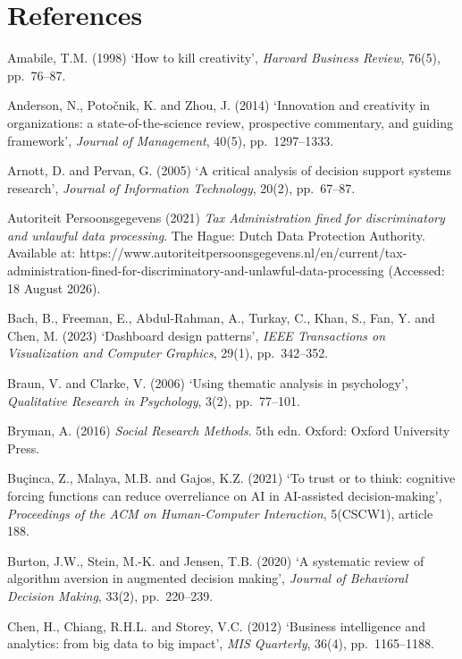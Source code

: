 \documentclass[11pt,a4paper]{article}
\numberwithin{figure}{section}
\numberwithin{table}{section}
\newcommand{\ct}[1]{\textcolor{citeblue}{#1}}          %
\begin{document}
\section*{References}
{\small{}
\setlength{\parindent}{-1.1em}
\setlength{\leftskip}{1.1em}
\setlength{\parskip}{4pt}

Amabile, T.M. (1998) `How to kill creativity', \emph{Harvard Business Review}, 76(5), pp.~76--87.

Anderson, N., Potočnik, K. and Zhou, J. (2014) `Innovation and creativity in organizations: a
state-of-the-science review, prospective commentary, and guiding framework', \emph{Journal of
Management}, 40(5), pp.~1297--1333.

Arnott, D. and Pervan, G. (2005) `A critical analysis of decision support systems research',
\emph{Journal of Information Technology}, 20(2), pp.~67--87.

Autoriteit Persoonsgegevens (2021) \emph{Tax Administration fined for discriminatory and unlawful
data processing}. The Hague: Dutch Data Protection Authority. Available at:
\ct{https://www.autoriteitpersoonsgegevens.nl/en/current/tax-administration-fined-for-discriminatory-and-unlawful-data-processing}
(Accessed: 18 August 2026).

Bach, B., Freeman, E., Abdul-Rahman, A., Turkay, C., Khan, S., Fan, Y. and Chen, M. (2023)
`Dashboard design patterns', \emph{IEEE Transactions on Visualization and Computer Graphics}, 29(1),
pp.~342--352.

Braun, V. and Clarke, V. (2006) `Using thematic analysis in psychology', \emph{Qualitative Research
in Psychology}, 3(2), pp.~77--101.

Bryman, A. (2016) \emph{Social Research Methods}. 5th edn. Oxford: Oxford University Press.

Buçinca, Z., Malaya, M.B. and Gajos, K.Z. (2021) `To trust or to think: cognitive forcing functions
can reduce overreliance on AI in AI-assisted decision-making', \emph{Proceedings of the ACM on
Human-Computer Interaction}, 5(CSCW1), article 188.

Burton, J.W., Stein, M.-K. and Jensen, T.B. (2020) `A systematic review of algorithm aversion in
augmented decision making', \emph{Journal of Behavioral Decision Making}, 33(2), pp.~220--239.

Chen, H., Chiang, R.H.L. and Storey, V.C. (2012) `Business intelligence and analytics: from big data
to big impact', \emph{MIS Quarterly}, 36(4), pp.~1165--1188.

}
\end{document}
